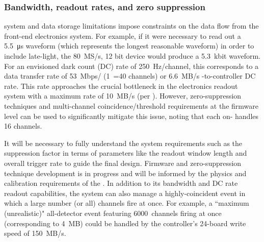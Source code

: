  
\subsubsection{Bandwidth, readout rates, and zero suppression}

 system and data storage limitations impose constraints on the  data flow from the front-end electronics system. 
For example, if it were necessary to read out a \SI{5.5}{\micro\second} waveform (which represents the longest reasonable waveform) 
in order to include late-light, the \SI{80}{MS/s}, 12 bit  device would produce a 5.3~kbit waveform. For an envisioned dark count (DC) rate of 250~Hz/channel, this corresponds to a data transfer rate of 53~Mbps/ (1~=40 channels) or 6.6~MB/s -to-controller DC rate. This rate approaches the crucial bottleneck in the electronics readout system with a maximum rate of 10~MB/s  %
(per ). However, zero-suppression techniques and multi-channel coincidence/threshold requirements at the  firmware level can be used to significantly mitigate this issue, noting that each on-  handles 16 channels. 

It will be necessary to fully understand the system requirements such as the suppression factor in terms of parameters like the readout window length and overall trigger rate to guide the final design. 
Firmware and zero-suppression technique development is in progress and will be informed by the physics and calibration requirements of the . 
In addition to its bandwidth and DC rate readout capabilities, the system can also  manage a highly-coincident event in which a large number (or all) channels fire at once. For example, a ``maximum (unrealistic)" all-detector event featuring 6000~channels firing at once (corresponding to 4~MB) could be handled by the controller's 24-board write speed of 150~MB/s. 

